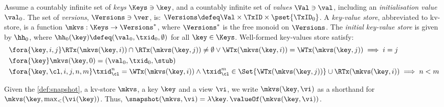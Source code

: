 \begin{definition}
\label{def:mkvs-appendix}
Assume a countably infinite set of \emph{keys} $\Keys \ni \key$, 
and a countably infinite set of  \emph{values} $\Val \ni \val$, 
including an \emph{initialisation value} $\val_0 $.
The set of \emph{versions}, $\Versions \ni \ver$, is: $\Versions \defeq \Val \times \TxID \times \pset{\TxID_{0}}$. 
A \emph{key-value store}, abbreviated to kv-store,  is a function $\mkvs: \Keys \rightarrow \Versions^{\ast}$, 
where $\Versions^{\ast}$ is the free monoid on $\Versions$. 
The \emph{initial key-value store} is given by $\hh_0$, where 
$\hh_{0}(\key)\defeq  (\val_0, \txid_0, \emptyset)$ for
all $\key \in \Keys$.
Well-formed key-values store satisfy:
\begin{align}
& \fora{\key, i, j} 
\RTx(\mkvs(\key, i)) \cap \RTx(\mkvs(\key, j)) \neq \emptyset \lor
\WTx(\mkvs(\key, i)) = \WTx(\mkvs(\key, j))
\implies i = j  \\
& \fora{\key} \mkvs(\key, 0) = (\val_0, \txid_0, \stub) \\
& \fora{ \key, \cl, i,j, n, m} 
\txid_{\cl}^{n} = \WTx(\mkvs(\key,i)) \wedge \txid_{\cl}^{m} \in
\Set{\WTx(\mkvs(\key,j))} \cup \RTx(\mkvs(\key, i)) \implies n < m
\end{align}
\end{definition}

Given the \cref{def:snapshot}, 
a kv-store $\mkvs$, a key $\key$ and a view $\vi$, 
we write $\mkvs(\key, \vi)$ as a shorthand for 
$\mkvs(\key, \max_{<}(\vi(\key))$. Thus, $\snapshot(\mkvs, \vi) = \lambda \key \ldotp \valueOf(\mkvs(\key, \vi))$. 
